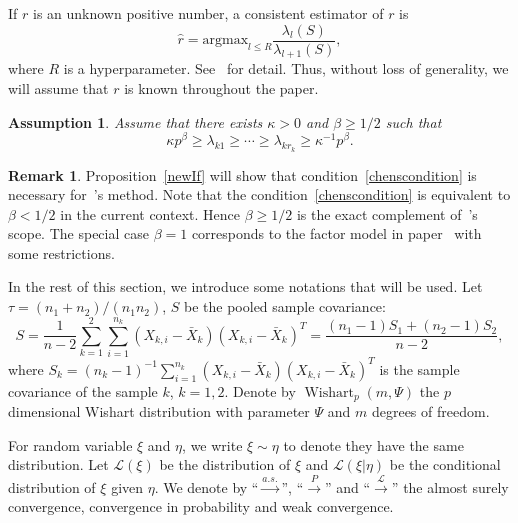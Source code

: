 \documentclass[review]{elsarticle}
\theoremstyle{plain}
\newtheorem{assumption}{\quad\quad Assumption}
\theoremstyle{definition}
\newtheorem{remark}{\quad\quad Remark}
\theoremstyle{remark}
\begin{document}
If $r$ is an unknown positive number, a consistent estimator of $r$ is
\begin{equation}\label{estimateR}
    \hat{r}=\textrm{argmax}_{l\leq R}\frac{\lambda_l(S)}{\lambda_{l+1}(S)},
\end{equation}
where $R$ is a hyperparameter.
    See~\cite{Ahn2009Eigenvalue} for detail.
    Thus, without loss of generality, we will assume that $r$ is known throughout the paper.

\begin{assumption}\label{orderOfBeta}
    Assume that there exists $\kappa>0$ and $\beta\geq {1}/{2}$ such that
    \begin{equation*}
        \kappa p^{\beta}\geq \lambda_{k1}\geq \cdots \geq\lambda_{kr_k}\geq \kappa^{-1}p^{\beta}.
\end{equation*}
\end{assumption}

\begin{remark}
Proposition~\ref{newIf} will show that condition~\eqref{chenscondition} is necessary for~\cite{Chen2010A}'s  method.
Note that the condition~\eqref{chenscondition} is equivalent to $\beta< 1/2$ in the current context.
Hence $\beta\geq 1/2$ is the exact complement of~\cite{Chen2010A}'s scope.
The special case $\beta=1$ corresponds to the factor model in paper~\cite{Ma2015A} with some restrictions.
\end{remark}

In the rest of this section, we introduce some  notations that will be used. Let $\tau={(n_1+n_2)}/{(n_1n_2)}$, $S$ be the pooled sample covariance:
\begin{equation*}
S=\frac{1}{n-2}\sum_{k=1}^2\sum_{i=1}^{n_k} (X_{k,i}-\bar{X}_k) {(X_{k,i}-\bar{X}_k)}^T
    =\frac{(n_1-1)S_1+(n_2-1)S_2}{n-2},
\end{equation*}
where
$S_k={(n_k -1)}^{-1}\sum_{i=1}^{n_k} (X_{k,i}-\bar{X}_k) {(X_{k,i}-\bar{X}_k)}^T
$
is the sample covariance  of the sample $k$, $k=1,2$.
Denote by $\operatorname{Wishart}_p(m,\Psi)$ the $p$ dimensional Wishart distribution with parameter $\Psi$ and $m$ degrees of freedom.

For random variable $\xi$ and $\eta$,
  we write $\xi\sim \eta$ to denote they have the same distribution.
  Let $\mathcal{L}(\xi)$ be the distribution of $\xi$ and $\mathcal{L}(\xi|\eta)$ be the conditional distribution of $\xi$ given $\eta$.
  We denote by ``$\xrightarrow{a.s.}$'', ``$\xrightarrow{P}$'' and ``$\xrightarrow{\mathcal{L}}$'' the almost surely convergence, convergence in probability and weak convergence.
\end{document}
